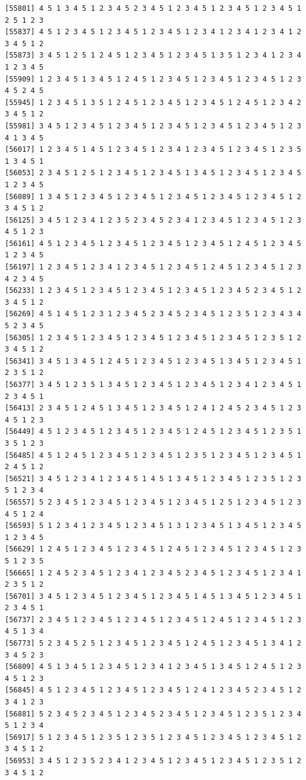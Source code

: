 \documentclass[
  english,
]{book}
\begin{document}
\begin{verbatim}
[55801] 4 5 1 3 4 5 1 2 3 4 5 2 3 4 5 1 2 3 4 5 1 2 3 4 5 1 2 3 4 5 1 2 5 1 2 3
[55837] 4 5 1 2 3 4 5 1 2 3 4 5 1 2 3 4 5 1 2 3 4 1 2 3 4 1 2 3 4 1 2 3 4 5 1 2
[55873] 3 4 5 1 2 5 1 2 4 5 1 2 3 4 5 1 2 3 4 5 1 3 5 1 2 3 4 1 2 3 4 1 2 3 4 5
[55909] 1 2 3 4 5 1 3 4 5 1 2 4 5 1 2 3 4 5 1 2 3 4 5 1 2 3 4 5 1 2 3 4 5 2 4 5
[55945] 1 2 3 4 5 1 3 5 1 2 4 5 1 2 3 4 5 1 2 3 4 5 1 2 4 5 1 2 3 4 2 3 4 5 1 2
[55981] 3 4 5 1 2 3 4 5 1 2 3 4 5 1 2 3 4 5 1 2 3 4 5 1 2 3 4 5 1 2 3 4 1 3 4 5
[56017] 1 2 3 4 5 1 4 5 1 2 3 4 5 1 2 3 4 1 2 3 4 5 1 2 3 4 5 1 2 3 5 1 3 4 5 1
[56053] 2 3 4 5 1 2 5 1 2 3 4 5 1 2 3 4 5 1 3 4 5 1 2 3 4 5 1 2 3 4 5 1 2 3 4 5
[56089] 1 3 4 5 1 2 3 4 5 1 2 3 4 5 1 2 3 4 5 1 2 3 4 5 1 2 3 4 5 1 2 3 4 5 1 2
[56125] 3 4 5 1 2 3 4 1 2 3 5 2 3 4 5 2 3 4 1 2 3 4 5 1 2 3 4 5 1 2 3 4 5 1 2 3
[56161] 4 5 1 2 3 4 5 1 2 3 4 5 1 2 3 4 5 1 2 3 4 5 1 2 4 5 1 2 3 4 5 1 2 3 4 5
[56197] 1 2 3 4 5 1 2 3 4 1 2 3 4 5 1 2 3 4 5 1 2 4 5 1 2 3 4 5 1 2 3 4 2 3 4 5
[56233] 1 2 3 4 5 1 2 3 4 5 1 2 3 4 5 1 2 3 4 5 1 2 3 4 5 2 3 4 5 1 2 3 4 5 1 2
[56269] 4 5 1 4 5 1 2 3 1 2 3 4 5 2 3 4 5 2 3 4 5 1 2 3 5 1 2 3 4 3 4 5 2 3 4 5
[56305] 1 2 3 4 5 1 2 3 4 5 1 2 3 4 5 1 2 3 4 5 1 2 3 4 5 1 2 3 5 1 2 3 4 5 1 2
[56341] 3 4 5 1 3 4 5 1 2 4 5 1 2 3 4 5 1 2 3 4 5 1 3 4 5 1 2 3 4 5 1 2 3 5 1 2
[56377] 3 4 5 1 2 3 5 1 3 4 5 1 2 3 4 5 1 2 3 4 5 1 2 3 4 1 2 3 4 5 1 2 3 4 5 1
[56413] 2 3 4 5 1 2 4 5 1 3 4 5 1 2 3 4 5 1 2 4 1 2 4 5 2 3 4 5 1 2 3 4 5 1 2 3
[56449] 4 5 1 2 3 4 5 1 2 3 4 5 1 2 3 4 5 1 2 4 5 1 2 3 4 5 1 2 3 5 1 3 5 1 2 3
[56485] 4 5 1 2 4 5 1 2 3 4 5 1 2 3 4 5 1 2 3 5 1 2 3 4 5 1 2 3 4 5 1 2 4 5 1 2
[56521] 3 4 5 1 2 3 4 1 2 3 4 5 1 4 5 1 3 4 5 1 2 3 4 5 1 2 3 5 1 2 3 5 1 2 3 4
[56557] 5 2 3 4 5 1 2 3 4 5 1 2 3 4 5 1 2 3 4 5 1 2 5 1 2 3 4 5 1 2 3 4 5 1 2 4
[56593] 5 1 2 3 4 1 2 3 4 5 1 2 3 4 5 1 3 1 2 3 4 5 1 3 4 5 1 2 3 4 5 1 2 3 4 5
[56629] 1 2 4 5 1 2 3 4 5 1 2 3 4 5 1 2 4 5 1 2 3 4 5 1 2 3 4 5 1 2 3 5 1 2 3 5
[56665] 1 2 4 5 2 3 4 5 1 2 3 4 1 2 3 4 5 2 3 4 5 1 2 3 4 5 1 2 3 4 1 2 3 5 1 2
[56701] 3 4 5 1 2 3 4 5 1 2 3 4 5 1 2 3 4 5 1 4 5 1 3 4 5 1 2 3 4 5 1 2 3 4 5 1
[56737] 2 3 4 5 1 2 3 4 5 1 2 3 4 5 1 2 3 4 5 1 2 4 5 1 2 3 4 5 1 2 3 4 5 1 3 4
[56773] 5 2 3 4 5 2 5 1 2 3 4 5 1 2 3 4 5 1 2 4 5 1 2 3 4 5 1 3 4 1 2 3 4 5 2 3
[56809] 4 5 1 3 4 5 1 2 3 4 5 1 2 3 4 1 2 3 4 5 1 3 4 5 1 2 4 5 1 2 3 4 5 1 2 3
[56845] 4 5 1 2 3 4 5 1 2 3 4 5 1 2 3 4 5 1 2 4 1 2 3 4 5 2 3 4 5 1 2 3 4 1 2 3
[56881] 5 2 3 4 5 2 3 4 5 1 2 3 4 5 2 3 4 5 1 2 3 4 5 1 2 3 5 1 2 3 4 5 1 2 3 4
[56917] 5 1 2 3 4 5 1 2 3 5 1 2 3 5 1 2 3 4 5 1 2 3 4 5 1 2 3 4 5 1 2 3 4 5 1 2
[56953] 3 4 5 1 2 3 5 2 3 4 1 2 3 4 5 1 2 3 4 5 1 2 3 4 5 1 2 3 5 1 2 3 4 5 1 2

\end{verbatim}
\end{document}
